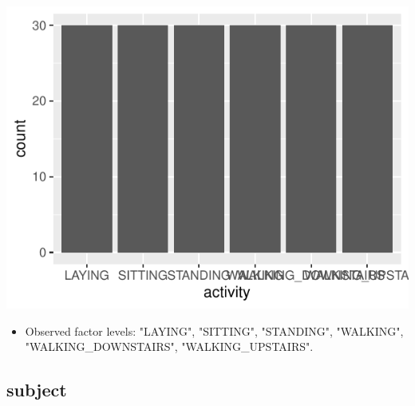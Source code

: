 \documentclass[
]{article}
\providecommand{\tightlist}{%
  \setlength{\itemsep}{0pt}\setlength{\parskip}{0pt}}
\begin{document}
\begin{minipage}{0.25 \textwidth}

\includegraphics{codebook_tidydatasub_files/figure-latex/Var-1-activity-1.pdf}

\end{minipage}

\begin{itemize}
\tightlist
\item
  Observed factor levels: "LAYING", "SITTING", "STANDING", "WALKING",
  "WALKING\_DOWNSTAIRS", "WALKING\_UPSTAIRS".
\end{itemize}

\noindent\makebox[\linewidth]{\rule{\textwidth}{0.4pt}}

\hypertarget{subject}{%
\subsection{subject}\label{subject}}
\end{document}

